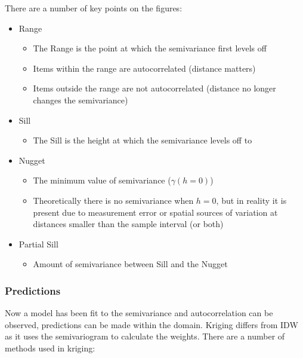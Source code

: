 \documentclass{article}
\begin{document}
There are a number of key points on the figures:

\begin{itemize}
    \item Range
    \begin{itemize}
        \item The Range is the point at which the semivariance first levels off
        \item Items within the range are autocorrelated (distance matters)
        \item Items outside the range are not autocorrelated (distance no longer changes the semivariance)
    \end{itemize}
    \item Sill 
    \begin{itemize}
        \item The Sill is the height at which the semivariance levels off to
    \end{itemize}
    \item Nugget
    \begin{itemize}
        \item The minimum value of semivariance ($\gamma (h = 0)$)
        \item Theoretically there is no semivariance when $h=0$, but in reality it is present due to measurement error or spatial sources of variation at distances smaller than the sample interval (or both)
    \end{itemize}
    \item Partial Sill
    \begin{itemize}
        \item Amount of semivariance between Sill and the Nugget
    \end{itemize}
\end{itemize}

\subsubsection{Predictions}

Now a model has been fit to the semivariance and autocorrelation can be observed, predictions can be made within the domain.
Kriging differs from IDW as it uses the semivariogram to calculate the weights.
There are a number of methods used in kriging:
\end{document}
